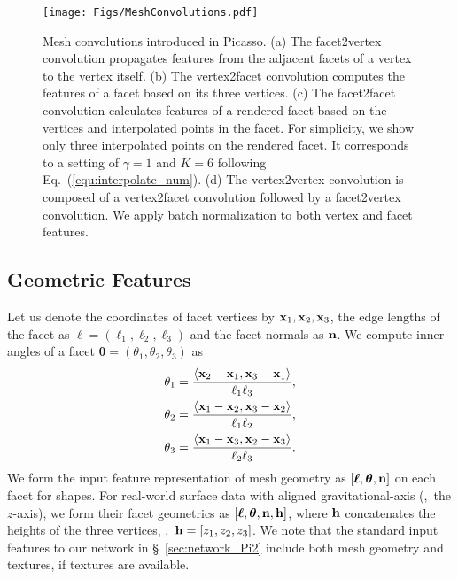 \begin{figure}[!t]
    \centering
\texttt{[image: Figs/MeshConvolutions.pdf]}
    \vspace{-3mm}
    \caption{Mesh convolutions introduced in Picasso. 
    (a) The facet2vertex convolution propagates features from the adjacent facets of a vertex to the vertex itself. (b) The vertex2facet convolution computes the features of a facet based on its three vertices. (c) The facet2facet convolution calculates features of a rendered facet based on the vertices and interpolated points in the facet. For simplicity, we show only three interpolated points on the rendered facet. It corresponds to a setting of $\gamma=1$ and $K=6$ following Eq.~(\ref{equ:interpolate_num}). (d) The vertex2vertex convolution is composed of a vertex2facet convolution followed by a facet2vertex convolution. We apply batch normalization to both vertex and facet features. 
    } 
    \label{fig:v2v_conv}
    \vspace{-2mm}
\end{figure}

\subsection{Geometric Features}\label{subsec:mesh_facet_geometry}
Let us denote the coordinates of facet vertices by ${\bf x}_1, {\bf x}_2, {\bf x}_3$, the edge lengths of the facet as ${\boldsymbol \ell}=(\ell_1,\ell_2,\ell_3)$ and the facet normals as ${\bf n}$. We compute inner angles of a facet  ${\boldsymbol \theta}=(\theta_1,\theta_2,\theta_3)$ as 
\begin{equation}\label{equ:inner_angles}
\begin{aligned}
\theta_1 &= \frac{\langle{\bf x}_2-{\bf x}_1, {\bf x}_3-{\bf x}_1\rangle}{\ell_1\ell_3}, \\
\theta_2 &= \frac{\langle{\bf x}_1-{\bf x}_2, {\bf x}_3-{\bf x}_2\rangle}{\ell_1\ell_2}, \\
\theta_3 &= \frac{\langle{\bf x}_1-{\bf x}_3, {\bf x}_2-{\bf x}_3\rangle}{\ell_2\ell_3}.
\end{aligned}
\end{equation}
We form the input feature representation of mesh geometry as $[{\boldsymbol \ell}, {\boldsymbol \theta}, {\bf n}]$ on each facet for shapes. For real-world surface data with aligned gravitational-axis (\eg,~the $z$-axis), we form their facet geometrics as $[{\boldsymbol \ell}, {\boldsymbol \theta}, {\bf n}, {\bf h}]$, where ${\bf h}$ concatenates the heights of the three vertices, \eg,~${\bf h}=[z_1,z_2,z_3]$. 
We note that the standard input features to our network in \S~\ref{sec:network_Pi2} include both mesh geometry and textures, if textures
are available.

